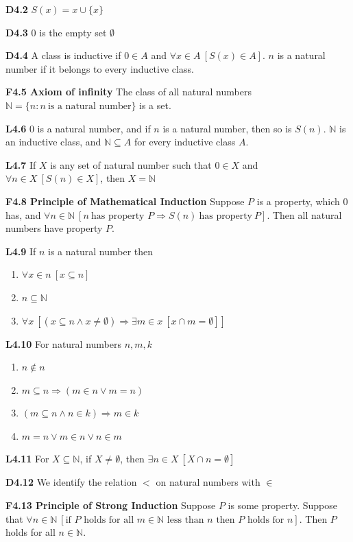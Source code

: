\documentclass[10pt, landscape]{article}
\begin{document}
\begin{multicols*}{3}
\textbf{D4.2} $S(x)=x \cup \{x\}$

\textbf{D4.3} $0$ is the empty set $\emptyset$

\textbf{D4.4} A class is inductive if $0 \in A$ and $\forall x \in A \ [S(x) \in A]$. $n$ is a natural number if it belongs to every inductive class.

\textbf{F4.5 Axiom of infinity} The class of all natural numbers $\mathbb{N}=\{n:n\ \text{is a natural number}\}$ is a set.

\textbf{L4.6} $0$ is a natural number, and if $n$ is a natural number, then so is $S(n)$. $\mathbb{N}$ is an inductive class, and $\mathbb{N}\subseteq A$ for every inductive class $A$.

\textbf{L4.7} If $X$ is any set of natural number such that $0 \in X$ and $\forall n \in X \ [S(n) \in X]$, then $X = \mathbb{N}$

\textbf{F4.8 Principle of Mathematical Induction} Suppose $P$ is a property, which $0$ has, and $\forall n \in \mathbb{N} \ [n \ \text{has property } P \Rightarrow S(n)\ \text{has property}\ P]$. Then all natural numbers have property $P$.

\textbf{L4.9} If $n$ is a natural number then
\begin{enumerate}
    \item $\forall x \in n \ [x \subseteq n]$
    \item $n \subseteq \mathbb{N}$
    \item $\forall x \ [(x \subseteq n \land x \neq \emptyset) \Rightarrow \exists m \in x \ [x \cap m = \emptyset]]$
\end{enumerate}

\textbf{L4.10} For natural numbers $n, m, k$
\begin{enumerate}
    \item $n \notin n$
    \item $m \subseteq n \Rightarrow (m \in n \lor m = n)$
    \item $(m \subseteq n \land n \in k) \Rightarrow m \in k$
    \item $m=n\lor m \in n \lor n \in m$
\end{enumerate}

\textbf{L4.11} For $X \subseteq \mathbb{N}$, if $X \neq \emptyset$, then $\exists n \in X \ [X \cap n = \emptyset]$

\textbf{D4.12} We identify the relation $<$ on natural numbers with $\in$

\textbf{F4.13 Principle of Strong Induction} Suppose $P$ is some property. Suppose that $\forall n \in \mathbb{N} \ [\text{if $P$ holds for all $m \in \mathbb{N}$ less than $n$ then $P$ holds for $n$}]$. Then $P$ holds for all $n \in \mathbb{N}$.


\end{multicols*}
\end{document}
